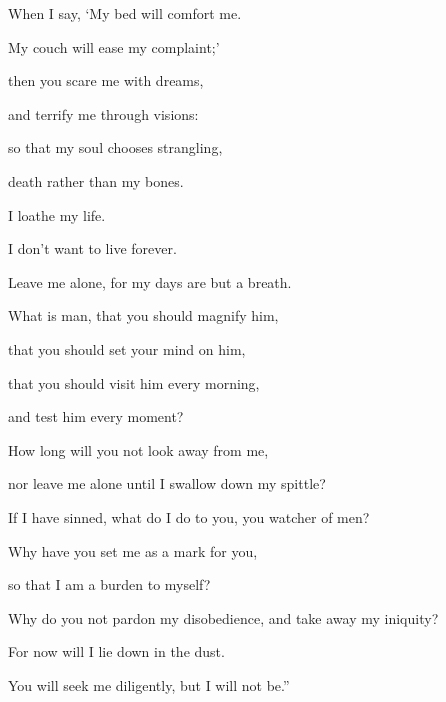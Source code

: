 {\par }{\Q {}When I say, ‘My bed will comfort me.
\par }{\QB My couch will ease my complaint;’
\par }{\Q {}then you scare me with dreams,
\par }{\QB and terrify me through visions:
\par }{\Q {}so that my soul chooses strangling,
\par }{\QB death rather than my bones.
\par }{\Q {}I loathe my life.
\par }{\QB I don’t want to live forever.
\par }{\QB Leave me alone, for my days are but a breath.
\par }{\Q {}What is man, that you should magnify him,
\par }{\QB that you should set your mind on him,
\par }{\Q {}that you should visit him every morning,
\par }{\QB and test him every moment?
\par }{\Q {}How long will you not look away from me,
\par }{\QB nor leave me alone until I swallow down my spittle?
\par }{\Q {}If I have sinned, what do I do to you, you watcher of men?
\par }{\QB Why have you set me as a mark for you,
\par }{\QB so that I am a burden to myself?
\par }{\Q {}Why do you not pardon my disobedience, and take away my iniquity?
\par }{\QB For now will I lie down in the dust.
\par }{\QB You will seek me diligently, but I will not be.”

}

